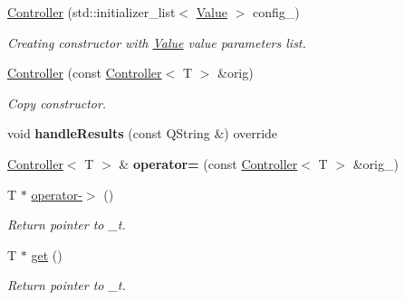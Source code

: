 \begin{DoxyCompactItemize}
\item 
\mbox{\label{classeven_1_1_controller_aa51707a2decb92b168c92e7483d94428}} 
\mbox{\hyperlink{classeven_1_1_controller_aa51707a2decb92b168c92e7483d94428}{Controller}} (std\+::initializer\+\_\+list$<$ \mbox{\hyperlink{classeven_1_1_value}{Value}} $>$ config\+\_\+)
\begin{DoxyCompactList}\small\item\em Creating constructor with \mbox{\hyperlink{classeven_1_1_value}{Value}} value parameters list. \end{DoxyCompactList}\item 
\mbox{\label{classeven_1_1_controller_adc4a69b728adf985079d1d72487ad877}} 
\mbox{\hyperlink{classeven_1_1_controller_adc4a69b728adf985079d1d72487ad877}{Controller}} (const \mbox{\hyperlink{classeven_1_1_controller}{Controller}}$<$ T $>$ \&orig)
\begin{DoxyCompactList}\small\item\em Copy constructor. \end{DoxyCompactList}\item 
\mbox{\label{classeven_1_1_controller_a70ba274f7d99b1919177056ba20282aa}} 
void {\bfseries handle\+Results} (const Q\+String \&) override
\item 
\mbox{\label{classeven_1_1_controller_ada213e7359b9ab662306a73bb56b3450}} 
\mbox{\hyperlink{classeven_1_1_controller}{Controller}}$<$ T $>$ \& {\bfseries operator=} (const \mbox{\hyperlink{classeven_1_1_controller}{Controller}}$<$ T $>$ \&orig\+\_\+)
\item 
\mbox{\label{classeven_1_1_controller_a62e0d45c88e8d6dd30e2c9b22cc7f4bf}} 
T $\ast$ \mbox{\hyperlink{classeven_1_1_controller_a62e0d45c88e8d6dd30e2c9b22cc7f4bf}{operator-\/$>$}} ()
\begin{DoxyCompactList}\small\item\em Return pointer to \+\_\+t. \end{DoxyCompactList}\item 
\mbox{\label{classeven_1_1_controller_a08b8c62e0a86563fe9d00876e6b75b76}} 
T $\ast$ \mbox{\hyperlink{classeven_1_1_controller_a08b8c62e0a86563fe9d00876e6b75b76}{get}} ()
\begin{DoxyCompactList}\small\item\em Return pointer to \+\_\+t. \end{DoxyCompactList}\end{DoxyCompactItemize}
